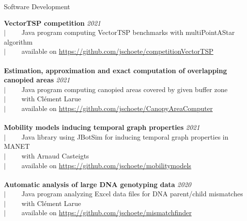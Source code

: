 \documentclass[french]{resume} %
\begin{document}
	\begin{rSection}{Software Development 
		}
		
		{\bf VectorTSP competition} \hfill {\em 2021}\\
		$| \qquad$ Java program computing VectorTSP benchmarks with multiPointAStar algorithm\\
		$| \qquad$ available on \url{https://github.com/jschoete/competitionVectorTSP}\\
		\\	
		{\bf Estimation, approximation and exact computation of overlapping canopied areas} \hfill {\em 2021}\\
		$| \qquad$ Java program computing canopied areas covered by given buffer zone\\
		$| \qquad$ with Clément Larue\\
		$| \qquad$ available on \url{https://github.com/jschoete/CanopyAreaComputer}\\
		\\	
		{\bf Mobility models inducing temporal graph properties} \hfill {\em 2021}\\
		$| \qquad$ Java library using JBotSim for inducing temporal graph properties in MANET\\
		$| \qquad$ with Arnaud Casteigts\\
		$| \qquad$ available on \url{https://github.com/jschoete/mobilitymodels}\\
		\\
		{\bf Automatic analysis of large DNA genotyping data} \hfill {\em 2020}\\
		$| \qquad$ Java program analyzing Excel data files for DNA parent/child mismatches\\
		$| \qquad$ with Clément Larue\\
		$| \qquad$ available on \url{https://github.com/jschoete/mismatchfinder}
	\end{rSection}
	\newpage
\end{document}
